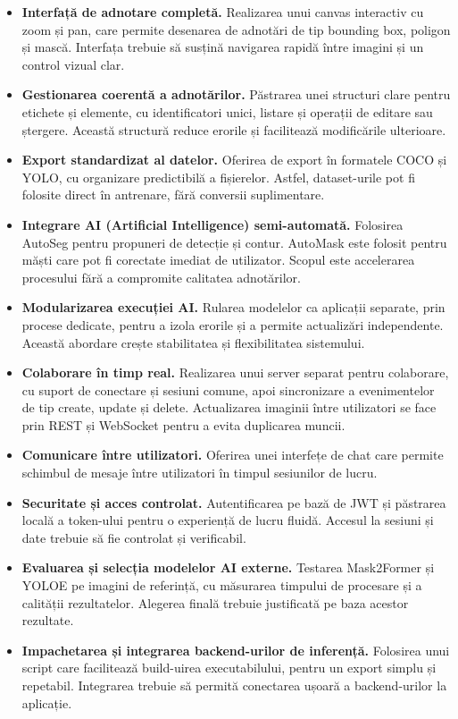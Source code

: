 \begin{itemize}
	\item \textbf{Interfață de adnotare completă.} Realizarea unui canvas interactiv cu zoom și pan, care permite desenarea de adnotări de tip bounding box, poligon și mască. Interfața trebuie să susțină navigarea rapidă între imagini și un control vizual clar.
	\item \textbf{Gestionarea coerentă a adnotărilor.} Păstrarea unei structuri clare pentru etichete și elemente, cu identificatori unici, listare și operații de editare sau ștergere. Această structură reduce erorile și facilitează modificările ulterioare.
	\item \textbf{Export standardizat al datelor.} Oferirea de export în formatele COCO și YOLO, cu organizare predictibilă a fișierelor. Astfel, dataset-urile pot fi folosite direct în antrenare, fără conversii suplimentare.
	\item \textbf{Integrare AI (Artificial Intelligence) semi-automată.} Folosirea AutoSeg pentru propuneri de detecție și contur.
	AutoMask este folosit pentru măști care pot fi corectate imediat de utilizator. Scopul este accelerarea procesului fără a compromite calitatea adnotărilor.
	\item \textbf{Modularizarea execuției AI.} Rularea modelelor ca aplicații separate, prin procese dedicate, pentru a izola erorile și a permite actualizări independente. Această abordare crește stabilitatea și flexibilitatea sistemului.
	\item \textbf{Colaborare în timp real.} Realizarea unui server separat pentru colaborare, cu suport de conectare și sesiuni comune, apoi sincronizare a evenimentelor de tip create, update și delete. Actualizarea imaginii între utilizatori se face prin REST și WebSocket pentru a evita duplicarea muncii.
	\item \textbf{Comunicare între utilizatori.} Oferirea unei interfețe de chat care permite schimbul de mesaje între utilizatori în timpul sesiunilor de lucru.
	\item \textbf{Securitate și acces controlat.} Autentificarea pe bază de JWT și păstrarea locală a token-ului pentru o experiență de lucru fluidă. Accesul la sesiuni și date trebuie să fie controlat și verificabil.
	\item \textbf{Evaluarea și selecția modelelor AI externe.} Testarea Mask2Former și YOLOE pe imagini de referință, cu măsurarea timpului de procesare și a calității rezultatelor. Alegerea finală trebuie justificată pe baza acestor rezultate.
	\item \textbf{Impachetarea și integrarea backend-urilor de inferență.} Folosirea unui script care facilitează build-uirea executabilului, pentru un export simplu și repetabil. Integrarea trebuie să permită conectarea ușoară a backend-urilor la aplicație.
\end{itemize}

